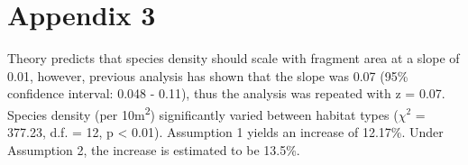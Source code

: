 \section*{Appendix 3}
\fi

Theory predicts that species density should scale with fragment area at a slope of 0.01, however, previous analysis has shown that the slope was 0.07 (95\% confidence interval: 0.048 - 0.11), thus the analysis was repeated with z = 0.07.  Species density (per 10m\textsuperscript{2}) significantly varied between habitat types ($\chi^2$ = 377.23, d.f. = 12, p < 0.01).  Assumption 1 yields an increase of 12.17\%. Under Assumption 2, the increase is estimated to be 13.5\%.